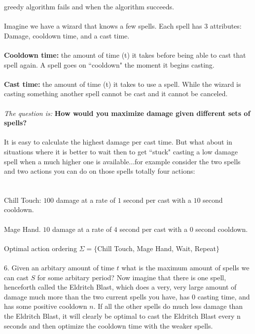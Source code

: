 \documentclass[12pt]{article}
\begin{document}
greedy algorithm fails and when the algorithm succeeds.\\\\
Imagine we have a wizard that knows a few spells. 
Each spell has 3 attributes: Damage, cooldown time, and a cast time. \\\\
\textbf{Cooldown time:} the amount of time (t) it takes 
before being able to cast that spell again. 
A spell goes on ``cooldown" the moment it begins casting.\\\\
\textbf{Cast time:} the amount of time (t) it takes 
to use a spell. While the wizard is casting 
something another spell cannot be cast and 
it cannot be canceled. \\\\
\textit{The question is:} \textbf{How would you maximize damage 
given different sets of spells?} \\\\
It is easy to calculate the highest damage per cast 
time. But what about in situations where it is better 
to wait then to get ``stuck" casting a low damage 
spell when a much higher one is available...for example consider
the two spells and two actions you can do on those spells totally four actions:\\\\\\
Chill Touch: $100$ damage at a rate of $1$ second per cast with a $10$ second cooldown. \\\\
Mage Hand. $10$ damage at a rate of $4$ second per cast with a $0$ second cooldown.\\\\
Optimal action ordering $\Sigma =\{$Chill Touch, Mage Hand, Wait, Repeat$\}$\\\\
6. Given an arbitary amount of time $t$ what is the maximum amount of spells
we can cast $S$ for some arbitary period?
\newpage
\noindent Now imagine that there is one spell, henceforth called the Eldritch Blast, 
which does a very, very large amount of damage much more than the two current spells you have, has $0$ casting time, and has 
some positive cooldown $n$. If all the other spells do much less damage than the 
Eldritch Blast, it will clearly be optimal to cast the Eldritch Blast every n seconds and 
then optimize the cooldown time with the weaker spells.\\\\
\end{document}

